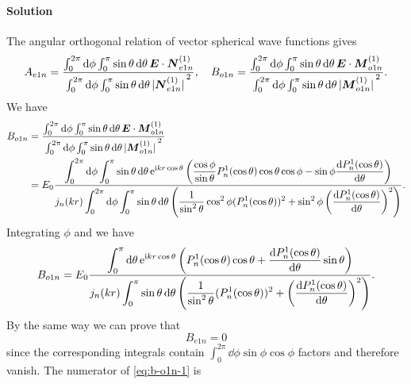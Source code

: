 \documentclass[hyperref, a4paper]{article}
\newcommand*{\ii}{\mathrm{i}}
\newcommand*{\ee}{\mathrm{e}}
\begin{document}
\paragraph{Solution} The angular orthogonal relation of vector spherical wave functions gives
\[
    A_{e1n} = \frac{\int_0^{2\pi} \dd{\phi} \int_0^\pi \sin \theta \dd{\theta} \vb*{E} \cdot \vb*{N}^{(1)}_{e1n}}{\int_0^{2\pi} \dd{\phi} \int_0^\pi \sin \theta \dd{\theta} \abs*{\vb*{N}_{e1n}^{(1)}}^2}, \quad B_{o1n} = \frac{\int_0^{2\pi} \dd{\phi} \int_0^\pi \sin \theta \dd{\theta} \vb*{E} \cdot \vb*{M}_{o1n}^{(1)}}{\int_0^{2\pi} \dd{\phi} \int_0^\pi \sin \theta \dd{\theta} \abs*{\vb*{M}^{(1)}_{o1n}}^2}.
\]
We have 
\[
    \begin{aligned}
        B_{o1n} &= \dfrac{\int_0^{2\pi} \dd{\phi} \int_0^\pi \sin \theta \dd{\theta} \vb*{E} \cdot \vb*{M}_{o1n}^{(1)}}{\int_0^{2\pi} \dd{\phi} \int_0^\pi \sin \theta \dd{\theta} \abs*{\vb*{M}^{(1)}_{o1n}}^2} \\
        &= E_0 \frac{\displaystyle \int_0^{2\pi} \dd{\phi} \int_0^\pi \sin \theta \dd{\theta} \ee^{\ii k r \cos \theta} \left( \frac{\cos\phi}{\sin\theta} P^1_n(\cos\theta) \cos\theta \cos\phi - \sin\phi \dv{P^1_n(\cos\theta)}{\theta} (-\sin\phi) \right)}{\displaystyle j_n(kr) \int_0^{2\pi} \dd{\phi} \int_0^\pi \sin \theta \dd{\theta} \left( \frac{1}{\sin^2 \theta} \cos^2\phi (P^1_n(\cos \theta))^2 + \sin^2\phi \left( \dv{P_n^1(\cos\theta)}{\theta} \right)^2 \right) }.
    \end{aligned}
\]
Integrating $\phi$ and we have 
\begin{equation}
    B_{o1n} = E_0 \frac{\displaystyle \int_0^\pi \dd{\theta} \ee^{\ii k r \cos \theta} \left( P^1_n(\cos\theta) \cos\theta + \dv{P^1_n(\cos\theta)}{\theta} \sin \theta \right)}{\displaystyle j_n(kr) \int_0^\pi \sin \theta \dd{\theta} \left( \frac{1}{\sin^2 \theta} (P^1_n(\cos \theta))^2 + \left( \dv{P_n^1(\cos\theta)}{\theta} \right)^2 \right) }.
    \label{eq:b-o1n-1}
\end{equation}
By the same way we can prove that 
\begin{equation}
    B_{e1n} = 0
    \label{eq:be1n-0}
\end{equation}
since the corresponding integrals contain $\int_0^{2\pi} \dd{\phi} \sin\phi \cos\phi$ factors and therefore vanish.
The numerator of \eqref{eq:b-o1n-1} is
\end{document}

